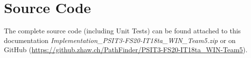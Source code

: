 \section{Source Code}
	The complete source code (including Unit Tests) can be found attached to this documentation \textit{Implementation\_PSIT3-FS20-IT18ta\_WIN\_Team5.zip} or on GitHub (\url{https://github.zhaw.ch/PathFinder/PSIT3-FS20-IT18ta_WIN-Team5}).